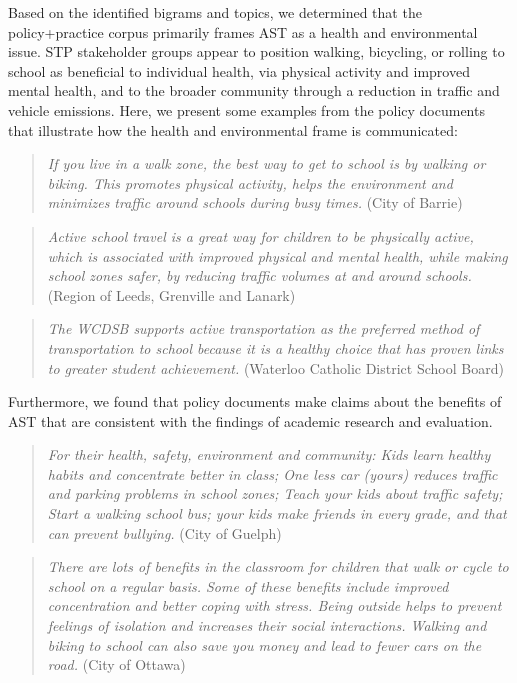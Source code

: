 \documentclass[]{elsarticle} %
\begin{document}
Based on the identified bigrams and topics, we determined that the
policy+practice corpus primarily frames AST as a health and
environmental issue. STP stakeholder groups appear to position walking,
bicycling, or rolling to school as beneficial to individual health, via
physical activity and improved mental health, and to the broader
community through a reduction in traffic and vehicle emissions. Here, we
present some examples from the policy documents that illustrate how the
health and environmental frame is communicated:

\begin{quote}
\emph{If you live in a walk zone, the best way to get to school is by
walking or biking. This promotes physical activity, helps the
environment and minimizes traffic around schools during busy times.}
(City of Barrie)
\end{quote}

\begin{quote}
\emph{Active school travel is a great way for children to be physically
active, which is associated with improved physical and mental health,
while making school zones safer, by reducing traffic volumes at and
around schools.}(Region of Leeds, Grenville and Lanark)
\end{quote}

\begin{quote}
\emph{The WCDSB supports active transportation as the preferred method
of transportation to school because it is a healthy choice that has
proven links to greater student achievement.} (Waterloo Catholic
District School Board)
\end{quote}

Furthermore, we found that policy documents make claims about the
benefits of AST that are consistent with the findings of academic
research and evaluation.

\begin{quote}
\emph{For their health, safety, environment and community: Kids learn
healthy habits and concentrate better in class; One less car (yours)
reduces traffic and parking problems in school zones; Teach your kids
about traffic safety; Start a walking school bus; your kids make friends
in every grade, and that can prevent bullying.} (City of Guelph)
\end{quote}

\begin{quote}
\emph{There are lots of benefits in the classroom for children that walk
or cycle to school on a regular basis. Some of these benefits include
improved concentration and better coping with stress. Being outside
helps to prevent feelings of isolation and increases their social
interactions. Walking and biking to school can also save you money and
lead to fewer cars on the road.} (City of Ottawa)
\end{quote}
\end{document}
